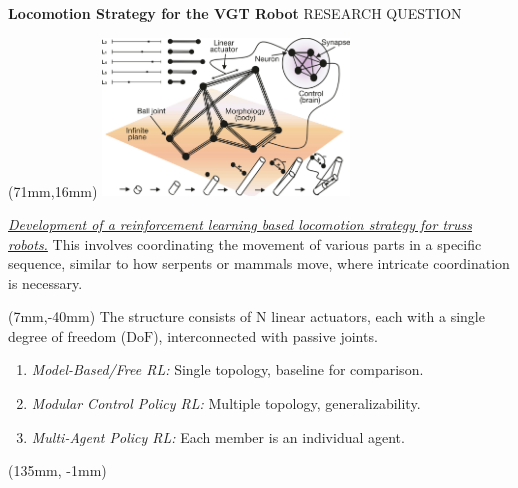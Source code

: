 \documentclass[11pt,aspectratio=169]{beamer}
\begin{document}
\begin{frame}[fragile]{\textbf{Locomotion Strategy for the VGT Robot} \hfill \fontsize{8}{8}\selectfont RESEARCH QUESTION}
    
        \begin{textblock*}{5cm}(71mm,16mm) %
        \includegraphics[height=42mm]{elements/[2].png}
        \end{textblock*}

         \uline{\textit{Development of a reinforcement learning based locomotion strategy for truss robots.}}
         This involves coordinating the movement of various parts in a specific sequence, similar to how serpents or mammals move, where intricate coordination is necessary.

        \bigskip
        

        \begin{textblock*}{60mm}(7mm,-40mm)
        The structure consists of $\mathrm{N}$ linear actuators, each with a single degree of freedom ($\mathrm{DoF}$), interconnected with passive joints.
        
        \begin{enumerate}
            \item \textit{Model-Based/Free RL:} Single topology, baseline for comparison.
            \item \textit{Modular Control Policy RL:} Multiple topology, generalizability.
            \item \textit{Multi-Agent Policy RL:} Each member is an individual agent.
        \end{enumerate}
        
        \end{textblock*}
        
        \begin{textblock*}{5cm}(135mm, -1mm) %
        {\tiny \cite{Lipson2000}}
        \end{textblock*}
        \vfill
 
\end{frame}
\end{document}
